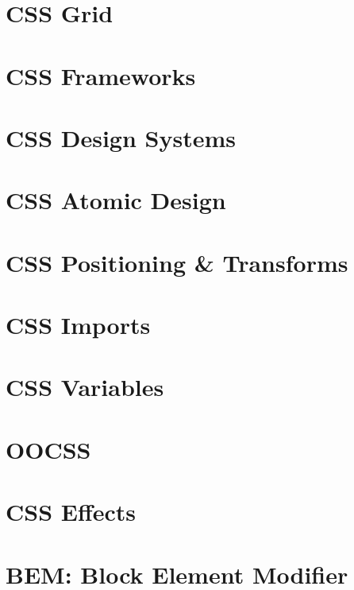 \documentclass[b5paper,openany]{book}
\begin{document}
\chapter{CSS Grid}


\chapter{CSS Frameworks}


\chapter{CSS Design Systems}


\chapter{CSS Atomic Design}


\chapter{CSS Positioning & Transforms}


\chapter{CSS Imports}


\chapter{CSS Variables}


\chapter{OOCSS}


\chapter{CSS Effects}


\chapter{BEM: Block Element Modifier}

\end{document}
